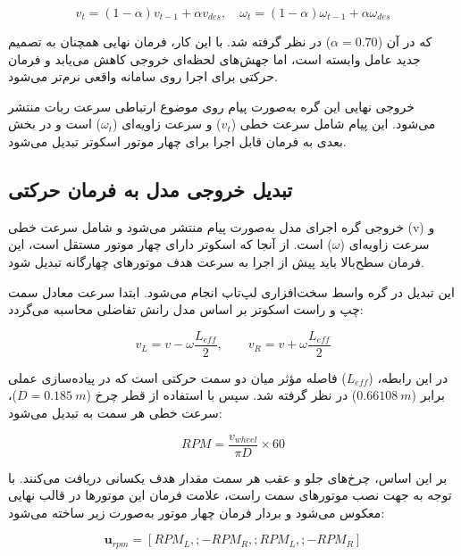 \begin{equation}
	v_t =
	(1-\alpha)v_{t-1}
	+
	\alpha v_{des}, \quad
	\omega_t =
	(1-\alpha)\omega_{t-1}
	+
	\alpha \omega_{des}
	\label{eq:real_w_and_v_smoothing}
\end{equation}

که در آن ($\alpha=0.70$) در نظر گرفته شد. با این کار، فرمان نهایی همچنان به تصمیم جدید عامل وابسته است، اما جهش‌های لحظه‌ای خروجی کاهش می‌یابد و فرمان حرکتی برای اجرا روی سامانه واقعی نرم‌تر می‌شود.

خروجی نهایی این گره به‌صورت پیام  روی موضوع ارتباطی سرعت ربات منتشر می‌شود. این پیام شامل سرعت خطی ($v_t$) و سرعت زاویه‌ای ($\omega_t$) است و در بخش بعدی به فرمان قابل اجرا برای چهار موتور اسکوتر تبدیل می‌شود.

\subsection{تبدیل خروجی مدل به فرمان حرکتی}
\label{subsec:real_action_to_motion_command}

خروجی گره اجرای مدل به‌صورت پیام  منتشر می‌شود و شامل سرعت خطی (v) و سرعت زاویه‌ای ($\omega$) است. از آنجا که اسکوتر دارای چهار موتور مستقل است، این فرمان سطح‌بالا باید پیش از اجرا به سرعت هدف موتورهای چهارگانه تبدیل شود.

این تبدیل در گره واسط سخت‌افزاری لپ‌تاپ انجام می‌شود. ابتدا سرعت معادل سمت چپ و راست اسکوتر بر اساس مدل رانش تفاضلی محاسبه می‌گردد:

\begin{equation}
	v_L = v - \omega \frac{L_{eff}}{2},
	\qquad
	v_R = v + \omega \frac{L_{eff}}{2}
	\label{eq:real_left_and_right_side_velocity}
\end{equation}

در این رابطه، ($L_{eff}$) فاصله مؤثر میان دو سمت حرکتی است که در پیاده‌سازی عملی برابر ($0.66108~m$) در نظر گرفته شد. سپس با استفاده از قطر چرخ ($D=0.185~m$)، سرعت خطی هر سمت به  تبدیل می‌شود:

\begin{equation}
	RPM = \frac{v_{wheel}}{\pi D} \times 60
	\label{eq:real_wheel_speed_to_rpm}
\end{equation}

بر این اساس، چرخ‌های جلو و عقب هر سمت مقدار هدف یکسانی دریافت می‌کنند. با توجه به جهت نصب موتورهای سمت راست، علامت فرمان این موتورها در قالب نهایی معکوس می‌شود و بردار فرمان چهار موتور به‌صورت زیر ساخته می‌شود:

\begin{equation}
	\mathbf{u}_{rpm} =
	[
	RPM_L,;
	-RPM_R,;
	RPM_L,;
	-RPM_R
	]
	\label{eq:real_four_motor_rpm_command}
\end{equation}

